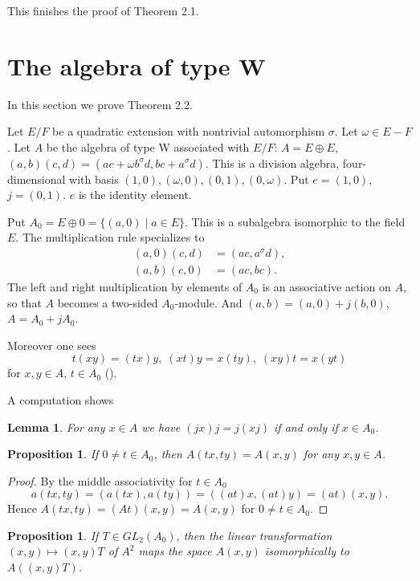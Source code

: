 \documentclass{article}
\newtheorem{prop}[thm]{Proposition}
\newtheorem{lem}[thm]{Lemma}
\begin{document}
This finishes the proof of Theorem 2.1.

\section{The algebra of type W}

In this section we prove Theorem 2.2.

Let $E/F$ be a quadratic extension with nontrivial automorphism $\sigma$.
Let $\omega\in E-F$.
Let $A$ be the algebra of type W associated with $E/F$:
$A=E\oplus E$, 
$(a,b)(c,d)=(ac+\omega b^{\sigma}d, bc+a^{\sigma}d)$.
This is a division algebra,  four-dimensional with basis
$(1,0), (\omega,0), (0,1), (0,\omega)$.
Put $e=(1,0)$, $j=(0,1)$. $e$ is the identity element.

Put $A_0=E\oplus 0=\{(a,0)\mid a\in E\}$.
This is a subalgebra isomorphic to the field $E$.
The multiplication rule specializes to
\begin{align*}
(a,0)(c,d)&=(ac, a^{\sigma}d),\\
(a,b)(c,0)&=(ac,bc).
\end{align*}
The left and right multiplication by elements of $A_0$  is an associative action 
on  $A$, so that $A$ becomes a two-sided $A_0$-module.
And
$(a,b)=(a,0)+j(b,0)$,
$A=A_0+jA_0$.

Moreover one sees 
$$
t(xy)=(tx)y,\; (xt)y=x(ty),\; (xy)t=x(yt)
$$
for $x,y\in A$, $t\in A_0$ (\cite{Knu}).


A computation shows

\begin{lem}
For any $x\in A$ we have $(jx)j=j(xj)$ if and only if $x\in A_0$.
\end{lem}



\begin{prop}
If $0\ne t\in A_0$, then $A(tx,ty)=A(x,y)$ for any $x,y\in A$.

\end{prop}

\begin{proof}
By the middle associativity for $t\in A_0$
$$
a(tx,ty)=(a(tx),a(ty))=((at)x,(at)y)=(at)(x,y).
$$
Hence
$A(tx,ty)=(At)(x,y)=A(x,y)$
for $0\ne t\in A_0$.
\end{proof}


\begin{prop}
If $T\in GL_2(A_0)$, then
the linear transformation $(x,y)\mapsto (x,y)T$ of $A^2$ maps the space
$A(x,y)$ isomorphically to $A((x,y)T)$.
\end{prop}
\end{document}
